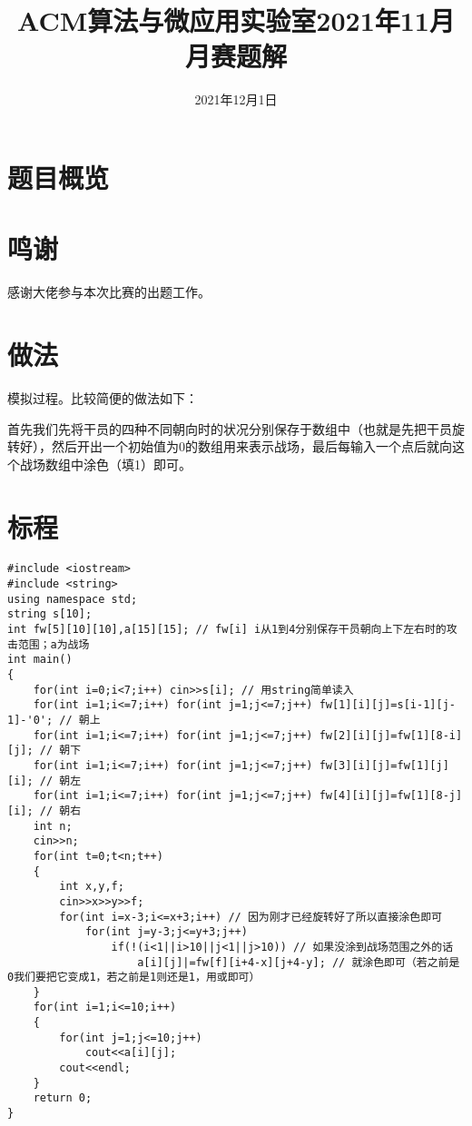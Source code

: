 \documentclass{ctsol}
\title{ACM算法与微应用实验室2021年11月月赛题解}
\date{2021年12月1日}
\begin{document}
\maketitle
{}

\section*{题目概览}
\solutiontab

\section*{鸣谢}
感谢\href{https://github.com/Tiphereth-A}{\@Tifa}大佬参与本次比赛的出题工作。

\makesolution
\section*{做法}
模拟过程。比较简便的做法如下：

首先我们先将干员的四种不同朝向时的状况分别保存于数组中（也就是先把干员旋转好），然后开出一个初始值为0的数组用来表示战场，最后每输入一个点后就向这个战场数组中涂色（填1）即可。

\section*{标程}
\begin{lstlisting}
#include <iostream>
#include <string>
using namespace std;
string s[10];
int fw[5][10][10],a[15][15]; // fw[i] i从1到4分别保存干员朝向上下左右时的攻击范围；a为战场
int main()
{
    for(int i=0;i<7;i++) cin>>s[i]; // 用string简单读入
    for(int i=1;i<=7;i++) for(int j=1;j<=7;j++) fw[1][i][j]=s[i-1][j-1]-'0'; // 朝上
    for(int i=1;i<=7;i++) for(int j=1;j<=7;j++) fw[2][i][j]=fw[1][8-i][j]; // 朝下
    for(int i=1;i<=7;i++) for(int j=1;j<=7;j++) fw[3][i][j]=fw[1][j][i]; // 朝左
    for(int i=1;i<=7;i++) for(int j=1;j<=7;j++) fw[4][i][j]=fw[1][8-j][i]; // 朝右
    int n;
    cin>>n;
    for(int t=0;t<n;t++)
    {
        int x,y,f;
        cin>>x>>y>>f;
        for(int i=x-3;i<=x+3;i++) // 因为刚才已经旋转好了所以直接涂色即可
            for(int j=y-3;j<=y+3;j++)
                if(!(i<1||i>10||j<1||j>10)) // 如果没涂到战场范围之外的话
                    a[i][j]|=fw[f][i+4-x][j+4-y]; // 就涂色即可（若之前是0我们要把它变成1，若之前是1则还是1，用或即可）
    }
    for(int i=1;i<=10;i++)
    {
        for(int j=1;j<=10;j++)
            cout<<a[i][j];
        cout<<endl;
    }
    return 0;
}
\end{lstlisting}
\end{document}
